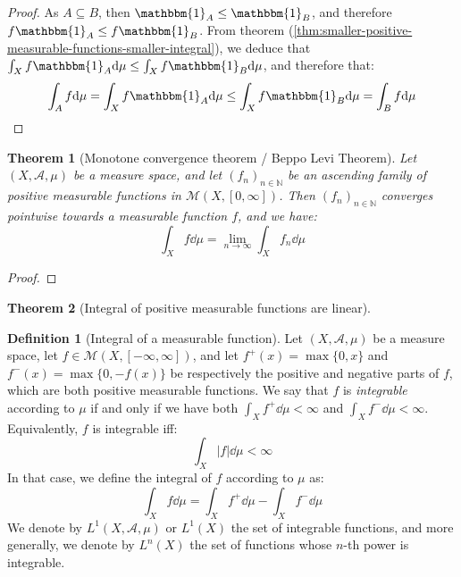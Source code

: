 \documentclass{article}
\newtheorem{theorem}{Theorem}[section]
\theoremstyle{definition}
\newtheorem{definition}{Definition}[section]
\theoremstyle{remark}
\theoremstyle{example}
\theoremstyle{notation}
\begin{document}
\begin{proof}
		As $A \subseteq B$, then $\mathbbm{1}_A \leq \mathbbm{1}_B$, and therefore $f \mathbbm{1}_A \leq f \mathbbm{1}_B$. From theorem (\ref{thm:smaller-positive-measurable-functions-smaller-integral}), we deduce that $\int_X f \mathbbm{1}_A \dd \mu \leq \int_X f \mathbbm{1}_B \dd \mu$, and therefore that:
				$$\int_A f \dd \mu = \int_X f \mathbbm{1}_A \dd \mu \leq \int_X f \mathbbm{1}_B \dd \mu = \int_B f \dd \mu$$
\end{proof}

\begin{theorem}[Monotone convergence theorem / Beppo Levi Theorem] %
		Let $(X, \mathcal{A}, \mu)$ be a measure space, and let $(f_n)_{n \in \mathbb{N}}$ be an ascending family of positive measurable functions in $\mathcal{M}(X, [0, \infty])$. Then $(f_n)_{n \in \mathbb{N}}$ converges pointwise towards a measurable function $f$, and we have:
				$$\int_X f \dd \mu = \lim_{n \rightarrow \infty} \int_X f_n \dd \mu$$
\end{theorem}

\begin{proof}
\end{proof}

\begin{theorem}[Integral of positive measurable functions are linear] %
\end{theorem}


\begin{definition}[Integral of a measurable function]
		Let $(X, \mathcal{A}, \mu)$ be a measure space, let $f \in \mathcal{M}(X, [-\infty, \infty])$, and let $f^+(x) = \max \{0, x\}$ and $f^-(x) = \max \{0, -f(x)\}$ be respectively the positive and negative parts of $f$, which are both positive measurable functions. We say that $f$ is \textit{integrable} according to $\mu$ if and only if we have both $\int_X f^+ \dd \mu < \infty$ and $\int_X f^- \dd \mu < \infty$. Equivalently, $f$ is integrable iff:
				$$\int_X |f| \dd \mu < \infty$$
		In that case, we define the integral of $f$ according to $\mu$ as:
				$$\int_X f \dd \mu = \int_X f^+ \dd \mu - \int_X f^- \dd \mu$$
		We denote by $L^1(X, \mathcal{A}, \mu)$ or $L^1(X)$ the set of integrable functions, and more generally, we denote by $L^n(X)$ the set of functions whose $n$-th power is integrable.
\end{definition}
\end{document}
